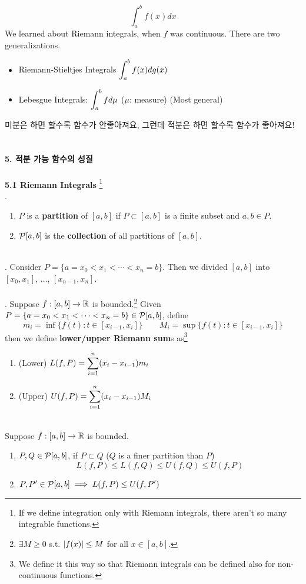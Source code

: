 \pagebreak
$$\int_a^b f(x) dx$$
We learned about Riemann integrals, when $f$ was continuous. There are two generalizations.
\begin{itemize}
	\item Riemann-Stieltjes Integrals $\displaystyle \int_a^b f(x) dg(x)$
	\item Lebesgue Integrals: $\displaystyle \int_a^b f d\mu$ ($\mu$: measure) (Most general)
\end{itemize}
미분은 하면 할수록 함수가 안좋아져요, 그런데 적분은 하면 할수록 함수가 좋아져요!\\
\\
\\
\textbf{\large 5. 적분 가능 함수의 성질}\\
\\
\textbf{5.1 Riemann Integrals}
\footnote{If we define integration only with Riemann integrals, there aren't so many integrable functions.}\\
. 
\begin{enumerate}
	\item $P$ is a \textbf{partition} of $[a, b]$ if $P\subset [a, b]$ is a finite subset and $a, b\in P$.
	\item $\mathcal{P}[a, b]$ is the \textbf{collection} of all partitions of $[a, b]$. 
\end{enumerate}~\\
\ex. Consider $P = \{a = x_0 < x_1 < \cdots < x_n=b \}$. Then we divided $[a, b]$ into $[x_0, x_1]$, $\dots$, $[x_{n-1}, x_n]$.\\
\\
. Suppose $f:[a, b]\rightarrow \mathbb{R}$ is bounded.\footnote{$\exists M \geq 0$ s.t. $\left|f(x)\right| \leq M$ for all $x\in [a, b]$.} Given $P = \{a = x_0 < x_1 < \cdots < x_n=b \} \in \mathcal{P}[a, b]$, define
$$m_i = \inf\{f(t): t\in [x_{i-1}, x_i] \} \qquad M_i = \sup\{f(t): t\in [x_{i-1}, x_i] \}$$
then we define \textbf{lower/upper Riemann sum}s as\footnote{We define it this way so that Riemann integrals can be defined also for non-continuous functions.}
\begin{enumerate}
	\item (Lower) $L(f, P) = \displaystyle \sum_{i=1}^n (x_i-x_{i-1}) m_i$
	\item (Upper) $U(f, P) = \displaystyle \sum_{i=1}^n (x_i-x_{i-1}) M_i$
\end{enumerate}~\\
 Suppose $f:[a, b]\rightarrow\mathbb{R}$ is bounded.
\begin{enumerate}
	\item $P, Q\in \mathcal{P}[a, b]$, if $P\subset Q$ ($Q$ is a finer partition than $P$)
	$$L(f, P) \leq L(f, Q)\leq U(f, Q)\leq U(f, P)$$
	\item $P, P' \in \mathcal{P}[a, b] \implies L(f, P)\leq U(f, P')$
\end{enumerate}
